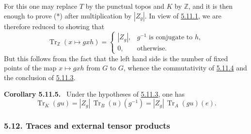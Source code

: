 \documentclass[11pt]{article}
\newenvironment{statement}[1]{\par\medskip\noindent\textbf{#1.}\ }{\par\medskip}
\providecommand{\Tr}{\operatorname{Tr}}
\providecommand{\Tr}{\operatorname{Tr}}
\providecommand{\Tr}{\operatorname{Tr}}
\providecommand{\Tr}{\operatorname{Tr}}
\providecommand{\Tr}{\operatorname{Tr}}
\begin{document}
For this one may replace $T$ by the punctual topos and $K$ by $\mathbb Z$, and it is then enough to prove (*) after multiplication by $|Z_g|$. In view of \hyperref[sga5:IIIB:proposition:5.11.1]{5.11.1}, we are therefore reduced to showing that
\[
\Tr_{\mathbb Z}(x\mapsto gxh)=
\begin{cases}
|Z_g|,& g^{-1}\text{ is conjugate to }h,\\
0,& \text{otherwise}.
\end{cases}
\]
But this follows from the fact that the left hand side is the number of fixed points of the map $x\mapsto gxh$ from $G$ to $G$, whence the commutativity of \hyperref[sga5:IIIB:equation:5.11.4]{5.11.4} and the conclusion of \hyperref[sga5:IIIB:proposition:5.11.3]{5.11.3}.

\label{sga5:IIIB:corollary:5.11.5}\begin{statement}{Corollary 5.11.5}
Under the hypotheses of \hyperref[sga5:IIIB:proposition:5.11.3]{5.11.3}, one has
\begin{equation}\tag{5.11.5}\label{sga5:IIIB:equation:5.11.5}
\Tr_K(gu)=|Z_g|\,\Tr_B(u)(g^{-1})=|Z_g|\,\Tr_A(gu)(e).
\end{equation}
\end{statement}

\subsubsection*{5.12. Traces and external tensor products}\label{sga5:IIIB:subsubsection:5.12}
\end{document}
